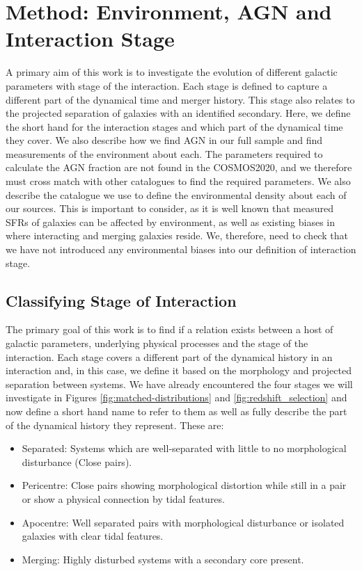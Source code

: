 \section{Method: Environment, AGN and Interaction Stage} \label{method}
A primary aim of this work is to investigate the evolution of different galactic parameters with stage of the interaction. Each stage is defined to capture a different part of the dynamical time and merger history. This stage also relates to the projected separation of galaxies with an identified secondary. Here, we define the short hand for the interaction stages and which part of the dynamical time they cover. We also describe how we find AGN in our full sample and find measurements of the environment about each. The parameters required to calculate the AGN fraction are not found in the COSMOS2020, and we therefore must cross match with other catalogues to find the required parameters. We also describe the catalogue we use to define the environmental density about each of our sources. This is important to consider, as it is well known that measured SFRs of galaxies can be affected by environment, as well as existing biases in where interacting and merging galaxies reside. We, therefore, need to check that we have not introduced any environmental biases into our definition of interaction stage. 

\subsection{Classifying Stage of Interaction}\label{sec:staging}
The primary goal of this work is to find if a relation exists between a host of galactic parameters, underlying physical processes and the stage of the interaction. Each stage covers a different part of the dynamical history in an interaction and, in this case, we define it based on the morphology and projected separation between systems. We have already encountered the four stages we will investigate in Figures \ref{fig:matched-distributions} and \ref{fig:redshift_selection} and now define a short hand name to refer to them as well as fully describe the part of the dynamical history they represent. These are:

\begin{itemize}
\item Separated: Systems which are well-separated with little to no morphological disturbance (Close pairs).
\item Pericentre: Close pairs showing morphological distortion while still in a pair or show a physical connection by tidal features.
\item Apocentre: Well separated pairs with morphological disturbance or isolated galaxies with clear tidal features.
\item Merging: Highly disturbed systems with a secondary core present.
\end{itemize}

